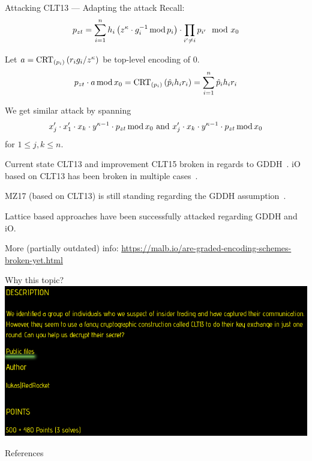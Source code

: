 \documentclass[english]{beamer}
\begin{document}
    \begin{frame}{Attacking CLT13 --- Adapting the attack}
        Recall:
        \begin{equation*}
            p_{zt} = \sum_{i=1}^n h_i \left(z^\kappa \cdot g_i^{-1} \operatorname{mod} p_i\right) \cdot \prod_{i' \neq i} p_{i'} \mod x_0
        \end{equation*}

        \pause
        Let $a = \operatorname{CRT}_{(p_{i})}\left(r_i g_i / z^\kappa\right)$ be top-level encoding of 0.
        \begin{equation*}
            p_{zt} \cdot a \operatorname{mod} x_0 = \operatorname{CRT}_{(p_{i})}\left(\hat{p}_i h_i r_i\right) = \sum_{i = 1}^n \hat{p}_i h_i r_i
        \end{equation*}

        \pause
        We get similar attack by spanning
        \begin{equation*}
            x'_j \cdot x'_1 \cdot x_k \cdot y^{\kappa - 1} \cdot p_{zt} \operatorname{mod} x_0 \text{ and } x'_j \cdot x_k \cdot y^{\kappa - 1} \cdot p_{zt} \operatorname{mod} x_0
        \end{equation*}
        for $1 \leq j,k \leq n$.
    \end{frame}
    \begin{frame}{Current state}
        CLT13 and improvement CLT15 broken in regards to GDDH~\cite{cryptoeprint:2014:906,cryptoeprint:2016:135}. iO based on CLT13 has been broken in multiple cases~\cite*{cryptoeprint:2019:1254,cryptoeprint:2019:309}.

        MZ17 (based on CLT13) is still standing regarding the GDDH assumption~\cite{cryptoeprint:2017:946}.

        Lattice based approaches have been successfully attacked regarding GDDH and iO.

        More (partially outdated) info: \url{https://malb.io/are-graded-encoding-schemes-broken-yet.html}
    \end{frame}
    \begin{frame}{Why this topic?}
        \includegraphics[width=\linewidth]{img/chall_desc.png}
    \end{frame}
    \begin{frame}[allowframebreaks]{References}
        \printbibliography[heading=none]
    \end{frame}
\end{document}
